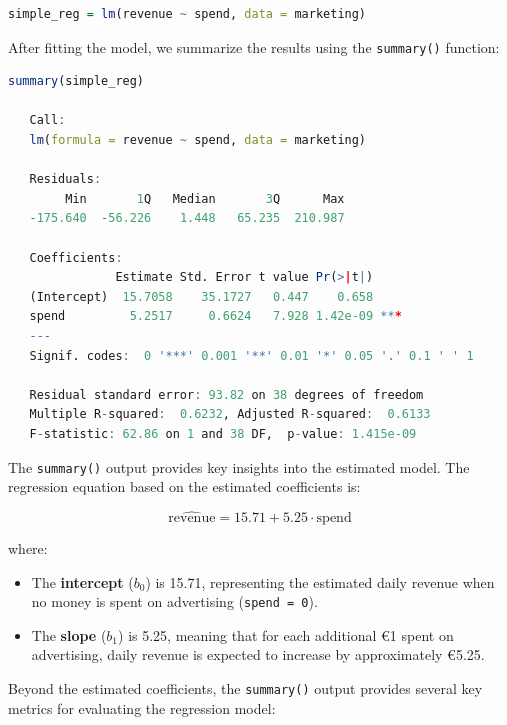 \documentclass[
]{book}
\newcommand{\passthrough}[1]{#1}
\providecommand{\tightlist}{%
  \setlength{\itemsep}{0pt}\setlength{\parskip}{0pt}}
\theoremstyle{definition}
\theoremstyle{definition}
\theoremstyle{definition}
\theoremstyle{definition}
\theoremstyle{remark}
\begin{document}
\begin{lstlisting}[language=R]
simple_reg = lm(revenue ~ spend, data = marketing)
\end{lstlisting}

After fitting the model, we summarize the results using the \passthrough{\lstinline!summary()!} function:

\begin{lstlisting}[language=R]
summary(simple_reg)
   
   Call:
   lm(formula = revenue ~ spend, data = marketing)
   
   Residuals:
        Min       1Q   Median       3Q      Max 
   -175.640  -56.226    1.448   65.235  210.987 
   
   Coefficients:
               Estimate Std. Error t value Pr(>|t|)    
   (Intercept)  15.7058    35.1727   0.447    0.658    
   spend         5.2517     0.6624   7.928 1.42e-09 ***
   ---
   Signif. codes:  0 '***' 0.001 '**' 0.01 '*' 0.05 '.' 0.1 ' ' 1
   
   Residual standard error: 93.82 on 38 degrees of freedom
   Multiple R-squared:  0.6232, Adjusted R-squared:  0.6133 
   F-statistic: 62.86 on 1 and 38 DF,  p-value: 1.415e-09
\end{lstlisting}

The \passthrough{\lstinline!summary()!} output provides key insights into the estimated model. The regression equation based on the estimated coefficients is:

\[
\hat{\text{revenue}} = 15.71 + 5.25 \cdot \text{spend}
\]

where:

\begin{itemize}
\tightlist
\item
  The \textbf{intercept} (\(b_0\)) is 15.71, representing the estimated daily revenue when no money is spent on advertising (\passthrough{\lstinline!spend = 0!}).\\
\item
  The \textbf{slope} (\(b_1\)) is 5.25, meaning that for each additional €1 spent on advertising, daily revenue is expected to increase by approximately €5.25.
\end{itemize}

Beyond the estimated coefficients, the \passthrough{\lstinline!summary()!} output provides several key metrics for evaluating the regression model:
\end{document}
